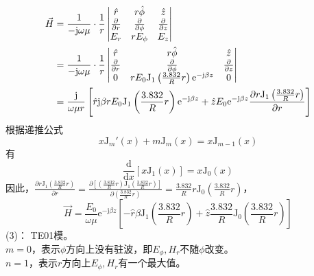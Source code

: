     \begin{align}
        \vec{H}&=\frac{1}{-\mathrm{j}\omega\mu}\cdot\frac{1}{r}\begin{vmatrix}
            \hat{r}&r\hat{\phi}&\hat{z}\\
            \frac{\partial }{\partial r}&\frac{\partial }{\partial \phi}&\frac{\partial }{\partial z}\\
            E_r&rE_\phi&E_z
        \end{vmatrix}\\
        &=\frac{1}{-\mathrm{j}\omega\mu}\cdot\frac{1}{r}\begin{vmatrix}
            \hat{r}&r\hat{\phi}&\hat{z}\\
            \frac{\partial }{\partial r}&\frac{\partial }{\partial \phi}&\frac{\partial }{\partial z}\\
            0&rE_0 \mathrm{J}_1\left(\frac{3.832}{R}r\right)\mathrm{e}^{-\mathrm{j}\beta z}&0
        \end{vmatrix}\notag\\
        &=\frac{\mathrm{j}}{\omega\mu r}\left[\hat{r}\mathrm{j}\beta rE_0 \mathrm{J}_1\left(\frac{3.832}{R}r\right)\mathrm{e}^{-\mathrm{j}\beta z}+\hat{z}E_0 \mathrm{e}^{-\mathrm{j}\beta z}\frac{\partial r\mathrm{J}_1\left(\frac{3.832}{R}r\right)}{\partial r}\right]\notag
    \end{align}
    根据递推公式
    \begin{equation}
        x \mathrm{J}_m'\left(x\right)+m \mathrm{J}_m\left(x\right)=x \mathrm{J}_{m-1}\left(x\right)
    \end{equation}
    有
    \begin{equation}
        \frac{\mathrm{d}}{\mathrm{d}x} \left[x \mathrm{J}_1\left(x\right)\right]=x\mathrm{J}_0\left(x\right)
    \end{equation}
    因此，$\frac{\partial r\mathrm{J}_1\left(\frac{3.832}{R}r\right)}{\partial r}=\frac{\partial \left[(\frac{3.832}{R}r)\mathrm{J}_1\left(\frac{3.832}{R}r\right)\right]}{\partial (\frac{3.832}{R}r)}=\frac{3.832}{R}r\mathrm{J}_0\left(\frac{3.832}{R}r\right) $，
    \begin{equation*}
        \vec{H}=\frac{E_0}{\omega\mu}\mathrm{e}^{-\mathrm{j}\beta z}\left[-\hat{r}\beta \mathrm{J}_1\left(\frac{3.832}{R}r\right)+\hat{z}\frac{3.832}{R}\mathrm{J}_0\left(\frac{3.832}{R}r\right)\right]
    \end{equation*}
    (3)： TE{\scriptsize 01}模。\\
    $m=0$，表示$\phi$方向上没有驻波，即$E_\phi,H_r$不随$\phi$改变。\\$n=1$，表示$r$方向上$E_\phi,H_r$有一个最大值。
